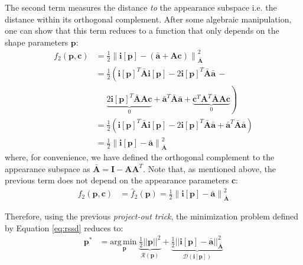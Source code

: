 The second term measures the distance \emph{to} the appearance subspace i.e. the distance within its orthogonal complement. After some algebraic manipulation, one can show that this term reduces to a function that only depends on the shape parameters $\mathbf{p}$:
\begin{equation}
    \begin{aligned}
        f_2(\mathbf{p}, \mathbf{c}) & = \frac{1}{2}\left\| \mathbf{i}[\mathbf{p}] - \left( \bar{\mathbf{a}} + \mathbf{A} \mathbf{c} \right) \right\|_{\bar{\mathbf{A}}}^2
        \\
        & = \frac{1}{2} \left( \mathbf{i}[\mathbf{p}]^T \bar{\mathbf{A}} \mathbf{i}[\mathbf{p}] - 2\mathbf{i}[\mathbf{p}]^T \bar{\mathbf{A}} \bar{\mathbf{a}} \, - \right.
        \\
        & \quad \,\, \left. \underbrace{2\mathbf{i}[\mathbf{p}]^T \bar{\mathbf{A}} \mathbf{A}\mathbf{c}}_{0} + \bar{\mathbf{a}}^T \bar{\mathbf{A}} \bar{\mathbf{a}} + \underbrace{\mathbf{c}^T \mathbf{A}^T \bar{\mathbf{A}} \mathbf{A}\mathbf{c}}_{0} \right)
        \\
        & = \frac{1}{2} (\mathbf{i}[\mathbf{p}]^T \bar{\mathbf{A}} \mathbf{i}[\mathbf{p}] - 2\mathbf{i}[\mathbf{p}]^T \bar{\mathbf{A}} \bar{\mathbf{a}} + \bar{\mathbf{a}}^T \bar{\mathbf{A}} \bar{\mathbf{a}} )
        \\
        & = \frac{1}{2} \left\| \mathbf{i}[\mathbf{p}] - \bar{\mathbf{a}} \right\|_{\bar{\mathbf{A}}}^2
    \label{eq:ssd_term2}
    \end{aligned}
\end{equation}
where, for convenience, we have defined the orthogonal complement to the appearance subspace as $\bar{\mathbf{A}}= \mathbf{I} -\mathbf{A}\mathbf{A}^T$. Note that, as mentioned above, the previous term does not depend on the appearance parameters $\mathbf{c}$:
\begin{equation}
    \begin{aligned}
        f_2(\mathbf{p}, \mathbf{c}) & = \hat{f}_2(\mathbf{p}) = \frac{1}{2}\left\| \mathbf{i}[\mathbf{p}] - \bar{\mathbf{a}} \right\|_{\bar{\mathbf{A}}}^2
    \label{eq:po}
    \end{aligned}
\end{equation}

Therefore, using the previous \emph{project-out trick}, the minimization problem defined by Equation \ref{eq:rssd} reduces to:
\begin{equation}
    \begin{aligned}
        \mathbf{p}^* & = \underset{\mathbf{p}} {\mathrm{arg\, min\;}} \underbrace{\frac{1}{2}||\mathbf{p}||^2}_{\mathcal{R} (\mathbf{p})} + \underbrace{\frac{1}{2}|| \mathbf{i}[\mathbf{p}] - \mathbf{\bar{a}} ||^2_{\bar{\mathbf{A}}}}_{\mathcal{D} (\mathbf{i}[\mathbf{p}])}
    \label{eq:rpo}
    \end{aligned}
\end{equation}

